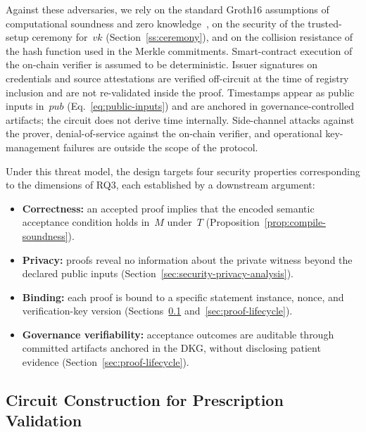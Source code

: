 \documentclass[journal]{IEEEtran}
\begin{document}
Against these adversaries, we rely on the standard Groth16
assumptions of computational soundness and zero
knowledge~\cite{groth2016}, on the security of the
trusted-setup ceremony for~$\mathit{vk}$
(Section~\ref{ss:ceremony}), and on the collision resistance
of the hash function used in the Merkle commitments.
Smart-contract execution of the on-chain verifier is assumed
to be deterministic.
Issuer signatures on credentials and source attestations are
verified off-circuit at the time of registry inclusion and are
not re-validated inside the proof.
Timestamps appear as public inputs in~$\mathit{pub}$
(Eq.~\ref{eq:public-inputs}) and are anchored in
governance-controlled artifacts; the circuit does not derive
time internally.
Side-channel attacks against the prover, denial-of-service
against the on-chain verifier, and operational key-management
failures are outside the scope of the protocol.

Under this threat model, the design targets four security
properties corresponding to the dimensions of RQ3, each
established by a downstream argument:
\begin{itemize}
\item \textbf{Correctness:}
an accepted proof implies that the encoded semantic acceptance
condition holds in~$M$ under~$T$
(Proposition~\ref{prop:compile-soundness}).
\item \textbf{Privacy:}
proofs reveal no information about the private witness beyond
the declared public inputs
(Section~\ref{sec:security-privacy-analysis}).
\item \textbf{Binding:}
each proof is bound to a specific statement instance, nonce,
and verification-key version
(Sections~\ref{sec:rx-circuit} and~\ref{sec:proof-lifecycle}).
\item \textbf{Governance verifiability:}
acceptance outcomes are auditable through committed artifacts
anchored in the DKG, without disclosing patient evidence
(Section~\ref{sec:proof-lifecycle}).
\end{itemize}

\subsection{Circuit Construction for Prescription Validation}
\label{sec:rx-circuit}
\end{document}

